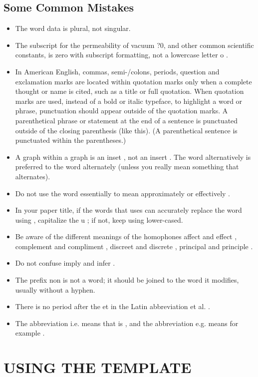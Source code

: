 \documentclass[a4paper, 10pt, conference]{ieeeconf}
\begin{document}
\subsection{Some Common Mistakes}
\begin{itemize}


\item The word data is plural, not singular.
\item The subscript for the permeability of vacuum ?0, and other common scientific constants, is zero with subscript formatting, not a lowercase letter o .
\item In American English, commas, semi-/colons, periods, question and exclamation marks are located within quotation marks only when a complete thought or name is cited, such as a title or full quotation. When quotation marks are used, instead of a bold or italic typeface, to highlight a word or phrase, punctuation should appear outside of the quotation marks. A parenthetical phrase or statement at the end of a sentence is punctuated outside of the closing parenthesis (like this). (A parenthetical sentence is punctuated within the parentheses.)
\item A graph within a graph is an inset , not an insert . The word alternatively is preferred to the word alternately (unless you really mean something that alternates).
\item Do not use the word essentially to mean approximately or effectively .
\item In your paper title, if the words that uses can accurately replace the word using , capitalize the u ; if not, keep using lower-cased.
\item Be aware of the different meanings of the homophones affect and effect , complement and compliment , discreet and discrete , principal and principle .
\item Do not confuse imply and infer .
\item The prefix non is not a word; it should be joined to the word it modifies, usually without a hyphen.
\item There is no period after the et in the Latin abbreviation et al. .
\item The abbreviation i.e. means that is , and the abbreviation e.g. means for example .

\end{itemize}


\section{USING THE TEMPLATE}
\end{document}

